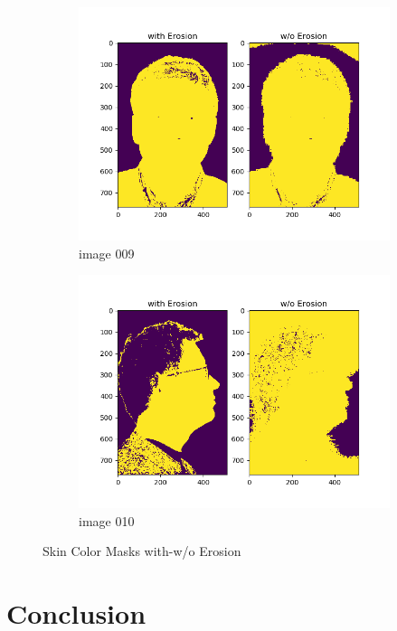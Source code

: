 \documentclass[11pt]{report}
\begin{document}
\begin{figure}[H]
\begin{subfigure}{0.3\textwidth}
        \includegraphics[width=\textwidth]{Task 2 Plots/skin_color_mask_erode_009.png}
        \caption{image 009}
        \label{fig:skin_colormask_erode9}
    \end{subfigure}
    \begin{subfigure}{0.3\textwidth}
        \centering
        \includegraphics[width=\textwidth]{Task 2 Plots/skin_color_mask_erode_010.png}
        \caption{image 010}
        \label{fig:skin_colormask_erode10}
    \end{subfigure}
    \caption{Skin Color Masks with-w/o Erosion}
    \label{fig:skincolormaskerodedsall}
\end{figure}

\section{Conclusion}
\end{document}
